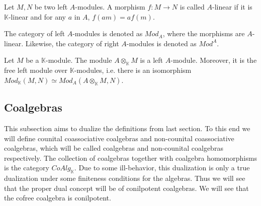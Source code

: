 \documentclass[../../thesis.tex]{subfiles}
\begin{document}
\begin{definition}[Modules]
\begin{center}
                \end{center}
            \end{definition}

            \begin{definition}
                Let $M,N$ be two left $A$-modules. A morphism $f:M\rightarrow N$ is called $A$-linear if it is $\mathbb{K}$-linear and for any $a$ in $A$, $f(am) = af(m)$.
            \end{definition}

            The category of left $A$-modules is denoted as $Mod_A$, where the morphisms are $A$-linear. Likewise, the category of right $A$-modules is denoted as $Mod^A$. 

            \begin{proposition}
                Let $M$ be a $\mathbb{K}$-module. The module $A\otimes_{\mathbb{K}}M$ is a left $A$-module. Moreover, it is the free left module over $\mathbb{K}$-modules, i.e. there is an isomorphism $Mod_{\mathbb{K}}(M,N)\simeq Mod_{A}(A\otimes_{\mathbb{K}}M,N)$.
            \end{proposition}
            
        \subsection{Coalgebras}
            This subsection aims to dualize the definitions from last section. To this end we will define counital coassociative coalgebras and non-counital coassociative coalgebras, which will be called coalgebras and non-counital coalgebras respectively. The collection of coalgebras together with coalgebra homomorphisms is the category $CoAlg_{\mathbb{K}}$. Due to some ill-behavior, this dualization is only a true dualization under some finiteness conditions for the algebras. Thus we will see that the proper dual concept will be of conilpotent coalgebras. We will see that the cofree coalgebra is conilpotent.
\end{document}
